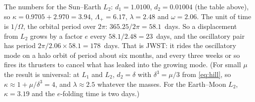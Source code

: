 \documentclass[12pt]{article}
\numberwithin{equation}{section}
\newcommand{\Om}{\Omega}
\begin{document}
\begin{tcolorbox}[enhanced,breakable,colback=gray!8,colframe=gray!45,boxrule=0.5pt,
    left=5pt,right=5pt,top=5pt,bottom=5pt]
The numbers for the Sun--Earth $L_2$: $d_1 = 1.0100$, $d_2 = 0.01004$ (the table above), so
$\kappa = 0.9705 + 2.970 = 3.94$, $\Lambda_+ = 6.17$,
$\lambda = 2.48$ and $\omega = 2.06$. The unit of time is $1/\Om$, the orbital period over
$2\pi$: $365.25/2\pi = 58.1$~days. So a displacement from $L_2$ grows by a factor $e$ every
$58.1/2.48 = 23$~days, and the oscillatory pair has period $2\pi/2.06 \times 58.1 = 178$~days.
That is JWST: it rides the oscillatory mode on a halo orbit of period about six months, and
every three weeks or so fires its thrusters to cancel what has leaked into the growing mode.
(For small $\mu$ the result is universal: at $L_1$ and $L_2$, $d_2 = \delta$ with $\delta^3 =
\mu/3$ from \eqref{eq:hill}, so $\kappa \approx 1 + \mu/\delta^3 = 4$, and $\lambda \approx 2.5$
whatever the masses. For the Earth--Moon $L_2$, $\kappa = 3.19$ and the $e$-folding time is
two days.)

\medskip


\end{tcolorbox}
\end{document}
